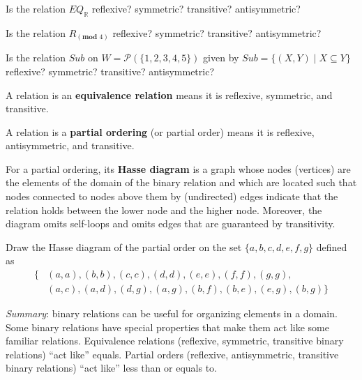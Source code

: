 \documentclass[12pt, oneside]{article}
\begin{document}
\vspace{80pt}

Is the relation $EQ_{\mathbb{R}}$ reflexive? symmetric? transitive? antisymmetric?

\vspace{80pt}

Is the relation $R_{(\textbf{mod } 4)}$ reflexive? symmetric? transitive? antisymmetric?

\vspace{80pt}

Is the relation $Sub$ on $W = \mathcal{P}(\{1,2,3,4,5\})$ given by $Sub = \{ (X,Y) \mid X \subseteq Y \}$
reflexive? symmetric? transitive? antisymmetric?

\vspace{80pt}
 \newpage


A relation is an {\bf equivalence relation} means it is reflexive, symmetric, and transitive. 

A relation is a {\bf partial ordering} (or partial order) means 
it is reflexive, antisymmetric, and transitive. 

For a partial ordering, its {\bf Hasse diagram} is a graph whose nodes (vertices) are the elements of the 
domain of the binary relation and which are located such that nodes connected to nodes
above them by (undirected) edges indicate that the relation holds between the lower node and the higher node. 
Moreover, the diagram omits self-loops and omits edges that are guaranteed by transitivity.
 

Draw the Hasse diagram of the partial order on the set $\{a,b,c,d,e,f,g\}$ defined as
\begin{align*}
    \{  &(a,a), (b,b), (c,c), (d,d), (e,e), (f,f), (g,g), \\
        &(a,c), (a,d), (d,g), (a,g), (b,f), (b,e), (e,g), (b,g) \}
\end{align*}

\vspace{100pt}

%
 \vfill

{\it Summary}: binary relations can be useful for organizing elements in a domain. 
Some binary relations have special properties that make them act like some familiar relations.
Equivalence relations (reflexive, symmetric, transitive binary relations) ``act like'' equals.
Partial orders (reflexive, antisymmetric, transitive binary relations) ``act like'' less than or equals to.
\newpage
\end{document}
